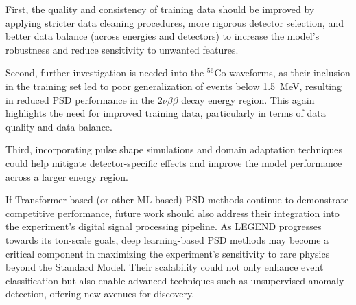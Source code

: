First, the quality and consistency of training data should be improved by applying stricter data cleaning procedures, more rigorous detector selection, and better data balance (across energies and detectors) to increase the model's robustness and reduce sensitivity to unwanted features. 

Second, further investigation is needed into the $^{56}$Co waveforms, as their inclusion in the training set led to poor generalization of events below 1.5~MeV, resulting in reduced PSD performance in the $2 \nu \beta \beta$ decay energy region. This again highlights the need for improved training data, particularly in terms of data quality and data balance. 

Third, incorporating pulse shape simulations and domain adaptation techniques could help mitigate detector-specific effects and improve the model performance across a larger energy region.  

If Transformer-based (or other ML-based) PSD methods continue to demonstrate competitive performance, future work should also address their integration into the experiment's digital signal processing pipeline. 
As LEGEND progresses towards its ton-scale goals, deep learning-based PSD methods may become a critical component in maximizing the experiment's sensitivity to rare physics beyond the Standard Model. 
Their scalability could not only enhance event classification but also enable advanced techniques such as unsupervised anomaly detection, offering new avenues for discovery. 
